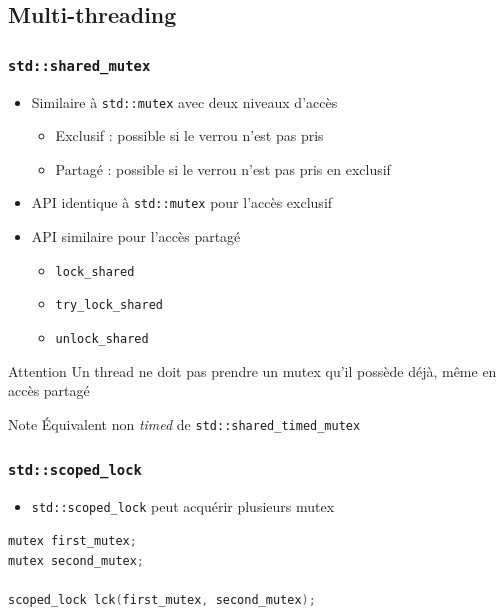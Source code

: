 \documentclass[C++.tex]{subfiles}
\begin{document}
\subsection*{Multi-threading}
\begin{frame}[fragile]
	\frametitle{\lstinline|std::shared_mutex|}
	\begin{itemize}
		\item Similaire à \lstinline|std::mutex| avec deux niveaux d'accès
		\begin{itemize}
			\item Exclusif : possible si le verrou n'est pas pris
			\item Partagé : possible si le verrou n'est pas pris en exclusif
		\end{itemize}
		\item API identique à \lstinline|std::mutex| pour l'accès exclusif
		\item API similaire pour l'accès partagé
		\begin{itemize}
			\item \lstinline|lock_shared|
			\item \lstinline|try_lock_shared|
			\item \lstinline|unlock_shared|
		\end{itemize}
	\end{itemize}

	\begin{alertblock}{Attention}
		Un thread ne doit pas prendre un mutex qu'il possède déjà, même en accès partagé
	\end{alertblock}

	\begin{block}{Note}
		Équivalent non \og \textit{timed}\fg{} de \lstinline|std::shared_timed_mutex|
	\end{block}
\end{frame}

\begin{frame}[fragile]
	\frametitle{\lstinline|std::scoped_lock|}
	\begin{itemize}
		\item \lstinline|std::scoped_lock| peut acquérir plusieurs mutex
	\end{itemize}

	\begin{lstlisting}[language=C++]
mutex first_mutex;
mutex second_mutex;

scoped_lock lck(first_mutex, second_mutex);\end{lstlisting}
\end{frame}
\end{document}
